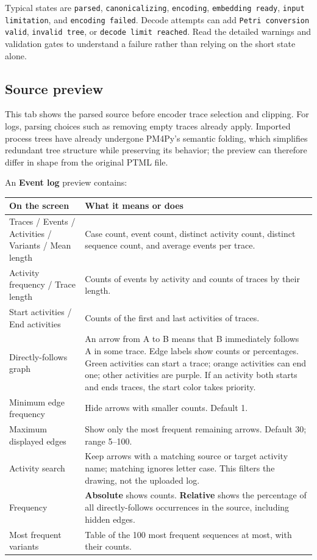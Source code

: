 \documentclass[11pt,a4paper]{article}
\makeatletter
\newcommand{\ui}[1]{\textbf{#1}}
\newcommand{\code}[1]{\nolinkurl{#1}}
\newenvironment{controls}{%
  \small\begin{longtable}{@{}>{\raggedright\arraybackslash}p{.34\linewidth}
    >{\raggedright\arraybackslash}p{.62\linewidth}@{}}
  \toprule\textbf{On the screen} & \textbf{What it means or does}\\\midrule\endhead
  \bottomrule\endfoot
}{\end{longtable}\normalsize}
\makeatother
\begin{document}
Typical states are \code{parsed}, \code{canonicalizing}, \code{encoding},
\code{embedding ready}, \code{input limitation}, and \code{encoding failed}.
Decode attempts can add \code{Petri conversion valid}, \code{invalid tree},
or \code{decode limit reached}. Read the detailed warnings and validation
gates to understand a failure rather than relying on the short state alone.

\subsection{Source preview}
This tab shows the parsed source before encoder trace selection and clipping.
For logs, parsing choices such as removing empty traces already apply. Imported
process trees have already undergone PM4Py's semantic folding, which simplifies
redundant tree structure while preserving its behavior; the preview can
therefore differ in shape from the original PTML file.

An \ui{Event log} preview contains:
\begin{controls}
Traces / Events / Activities / Variants / Mean length & Case count, event
count, distinct activity count, distinct sequence count, and average events
per trace.\\
Activity frequency / Trace length & Counts of events by activity and counts
of traces by their length.\\
Start activities / End activities & Counts of the first and last activities
of traces.\\
Directly-follows graph & An arrow from A to B means that B immediately follows
A in some trace. Edge labels show counts or percentages. Green activities
can start a trace; orange activities can end one; other activities are purple.
If an activity both starts and ends traces, the start color takes priority.\\
Minimum edge frequency & Hide arrows with smaller counts. Default 1.\\
Maximum displayed edges & Show only the most frequent remaining arrows.
Default 30; range 5--100.\\
Activity search & Keep arrows with a matching source or target activity name;
matching ignores letter case. This filters the drawing, not the uploaded log.\\
Frequency & \ui{Absolute} shows counts. \ui{Relative} shows the percentage
of all directly-follows occurrences in the source, including hidden edges.\\
Most frequent variants & Table of the 100 most frequent sequences at most,
with their counts.\\
\end{controls}
\end{document}
